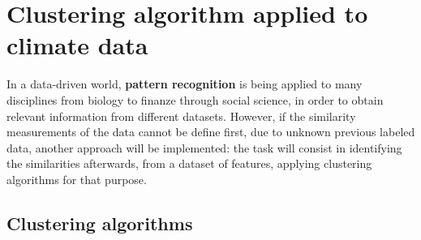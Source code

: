 \section{Clustering algorithm applied to climate data}




In a data-driven world, \textbf{pattern recognition} is being applied to many disciplines from biology to finanze through social science, in order to obtain relevant information from different datasets.
However, if the similarity measurements of the data cannot be define first, due to unknown previous labeled data, another approach will be implemented: the task will consist in identifying the similarities afterwards, from a dataset of features, applying clustering algorithms for that purpose.

\subsection{Clustering algorithms}

